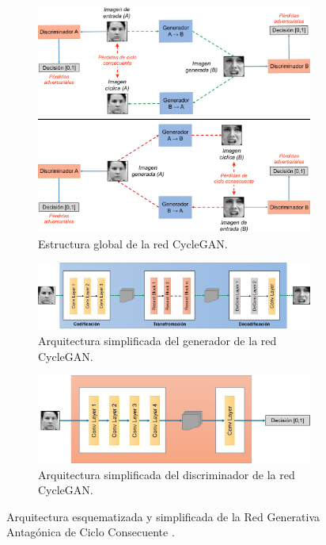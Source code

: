 \begin{figure}
    \centering
    \begin{subfigure}[t]{0.8\textwidth}
      \centering
      \includegraphics[width=\linewidth]{Images/CycleGANArchitecture.png}
      \caption{Estructura global de la red CycleGAN.}
      \label{fig:CycleGAN_general}
    \end{subfigure}
    
    \vspace{1cm}
    \begin{subfigure}[t]{0.8\textwidth}
      \centering
      \includegraphics[width=\linewidth]{Images/Generator.png}
      \caption{Arquitectura simplificada del generador de la red CycleGAN.}
      \label{fig:Generator}
    \end{subfigure}
    
    \vspace{1cm}
    \begin{subfigure}[t]{.7\textwidth}
      \centering
      \includegraphics[width=\linewidth]{Images/Discriminator.png}
      \caption{Arquitectura simplificada del discriminador de la red CycleGAN.}
      \label{fig:Discriminator}
    \end{subfigure}
    \caption{Arquitectura esquematizada y simplificada de la Red Generativa Antagónica de Ciclo Consecuente \cite{img:CycleGAN}.}
    \label{fig:CycleGANArchitecture}
\end{figure}

